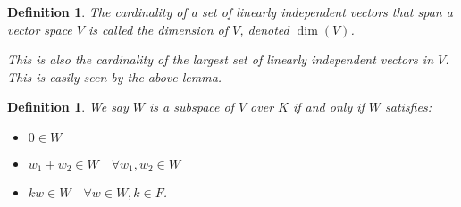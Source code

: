 \documentclass{article}
\theoremstyle{norm}
\newtheorem{df}[thm]{Definition}
\begin{document}
\begin{df}
The cardinality of a set of linearly independent vectors that span a
vector space $V$ is called the dimension of $V$, denoted $\dim(V)$.

This is also the cardinality of the largest set of linearly independent
vectors in $V$. This is easily seen by the above lemma.
\end{df}

\begin{df}
We say $W$ is a subspace of $V$ over $K$ if and only if $W$ satisfies:
\begin{itemize}
\item $0 \in W$
\item $w_1 + w_2 \in W \quad \forall w_1, w_2 \in W$
\item $k w \in W \quad \forall w \in W, k \in F$.
\end{itemize}
\end{df}
\end{document}
